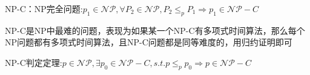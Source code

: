 \documentclass[12pt, a4paper, oneside]{ctexart}
\begin{document}
NP-C：NP完全问题:$p_1\in\mathcal{NP},\forall P_2\in\mathcal{NP},P_2\leq _pP_1\Rightarrow p_1\in\mathcal{NP}-C$

NP-C是NP中最难的问题，表现为如果某一个NP-C有多项式时间算法，那么每个NP问题都有多项式时间算法，且NP-C问题都是同等难度的，用归约证明即可

NP-C判定定理:$p\in\mathcal{NP},\exists p_0\in\mathcal{NP-}C,s.t.p\leq _pp_0\Rightarrow p\in\mathcal{NP}-C$
























% 
% 
\end{document}
